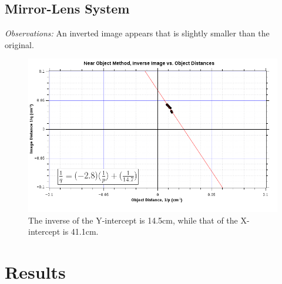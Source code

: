 \documentclass[twocolumn,english]{IEEEtran}
\theoremstyle{plain}
\theoremstyle{plain}
\begin{document}
\subsection{Mirror-Lens System}
\textit{Observations:} An inverted image appears that is slightly smaller than the original.

\onecolumn

\begin{figure}[h!]
	\begin{centering}
	\begin{center}
	\includegraphics[width=\linewidth]{./Images/Graph1.png}
	\caption{The inverse of the Y-intercept is 14.5cm, while that of the X-intercept is 41.1cm.}
	\label{fig:1q1p}
	\end{center}
	\par\end{centering}
\end{figure}

\twocolumn
\section{Results}
\end{document}

